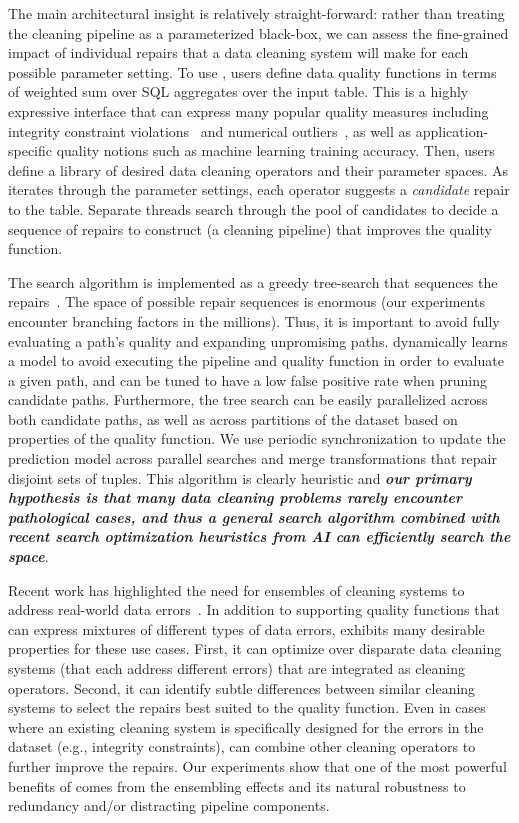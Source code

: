 The main architectural insight is relatively straight-forward: rather than treating the cleaning pipeline as a parameterized black-box, we can assess the fine-grained impact of individual repairs that a data cleaning system will make for each possible parameter setting.
To use \sys, users define data quality functions in terms of weighted sum over SQL aggregates over the input table.  This is a highly expressive interface that can express many popular quality measures including integrity constraint violations~\cite{ilyas2015trends} and numerical outliers~\cite{bailis2017macrobase}, as well as application-specific quality notions such as machine learning training accuracy.
Then, users define a library of desired data cleaning operators and their parameter spaces.
As \sys iterates through the parameter settings, each operator suggests a \emph{candidate} repair to the table.
Separate threads search through the pool of candidates to decide a sequence of repairs to construct (a cleaning pipeline) that improves the quality function.

The search algorithm is implemented as a greedy tree-search that sequences the repairs~\cite{russell2016artificial}.
The space of possible repair sequences is enormous (our experiments encounter branching factors in the millions).
Thus, it is important to avoid fully evaluating a path's quality and expanding unpromising paths.    
\sys dynamically learns a model to avoid executing the pipeline and quality function in order to evaluate a given path, and can be tuned to have a low false positive rate when pruning candidate paths.  
Furthermore, the tree search can be easily parallelized across both candidate paths, as well as across partitions of the dataset based on properties of the quality function.
We use periodic synchronization to update the prediction model across parallel searches and merge transformations that repair disjoint sets of tuples. 
This algorithm is clearly heuristic and \textbf{\emph{our primary hypothesis is that many data cleaning problems rarely encounter pathological cases, and thus a general search algorithm combined with recent search optimization heuristics from AI can efficiently search the space}}.

Recent work has highlighted the need for ensembles of cleaning systems to address real-world data errors~\cite{DBLP:journals/pvldb/AbedjanCDFIOPST16}.  In addition to supporting quality functions that can express mixtures of different types of data errors, \sys exhibits many desirable properties for these use cases.  
First, it can optimize over disparate data cleaning systems (that each address different errors) that are integrated as \sys cleaning operators.  Second, it can identify subtle differences between similar cleaning systems to select the repairs best suited to the quality function.  Even in cases where an existing cleaning system is specifically designed for the errors in the dataset (e.g., integrity constraints), \sys can combine other cleaning operators to further improve the repairs.  Our experiments show that one of the most powerful benefits of \sys comes from the ensembling effects and its natural robustness to redundancy and/or distracting pipeline components.


